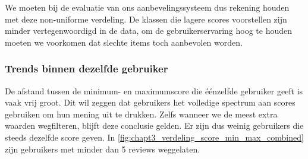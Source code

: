We moeten bij de evaluatie van ons aanbevelingssysteem dus rekening houden met deze non-uniforme verdeling. De klassen die lagere scores voorstellen zijn minder vertegenwoordigd in de data, om de gebruikerservaring hoog te houden moeten we voorkomen dat slechte items toch aanbevolen worden.

\subsubsection{Trends binnen dezelfde gebruiker}
De afstand tussen de minimum- en maximumscore die éénzelfde gebruiker geeft is vaak vrij groot. Dit wil zeggen dat gebruikers het volledige spectrum aan scores gebruiken om hun mening uit te drukken. Zelfs wanneer we de meest extra waarden wegfilteren, blijft deze conclusie gelden. Er zijn dus weinig gebruikers die steeds dezelfde score geven. In \autoref{fig:chapt3_verdeling_score_min_max_combined} zijn gebruikers met minder dan 5 reviews weggelaten.
